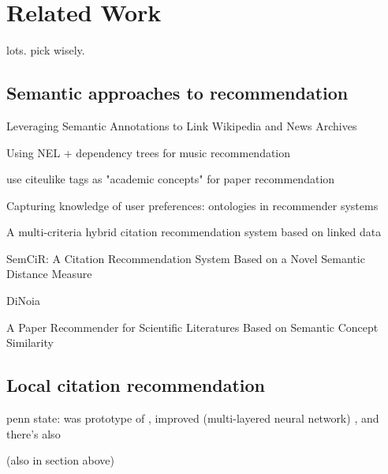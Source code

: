 \chapter{Related Work}\label{chap:relatedwork}
lots. pick wisely.

\section{Semantic approaches to recommendation}

Leveraging Semantic Annotations to Link Wikipedia and News Archives\cite{Mishra2016}

Using NEL + dependency trees for music recommendation\cite{Sordo2015}

use citeulike tags as "academic concepts" for paper recommendation\cite{Jiang2012}

Capturing knowledge of user preferences: ontologies in recommender systems\cite{Middleton2001,Middleton2004}

A multi-criteria hybrid citation recommendation system based on linked data\cite{Zarrinkalam2012}

SemCiR: A Citation Recommendation System Based on a Novel Semantic Distance Measure\cite{Zarrinkalam2013}

DiNoia\cite{DiNoia2012}

A Paper Recommender for Scientific Literatures Based on Semantic Concept Similarity\cite{Zhang2008}

\section{Local citation recommendation}

penn state: \cite{He2010} was prototype of \cite{Huang2014}, improved (multi-layered neural network) \cite{Huang2015}, and there's also \cite{He2011}

\cite{Zarrinkalam2012} (also in section above)

\cite{Duma2014,Duma2016}

\cite{Ebesu2017}

\cite{Kobayashi2018}
